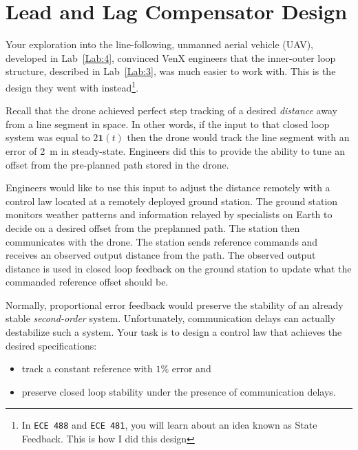 \chapter{Lead and Lag Compensator Design}\label{Lab:5}
Your exploration into the line-following, unmanned aerial vehicle (UAV), developed in Lab~\ref{Lab:4}, convinced VenX engineers that the inner-outer loop structure, described in Lab~\ref{Lab:3}, was much easier to work with.
This is the design they went with instead\footnote{In \texttt{ECE 488} and \texttt{ECE 481}, you will learn about an idea known as State Feedback. This is how I did this design}.
%
\begin{center}
  
\end{center}
%
Recall that the drone achieved perfect step tracking of a desired \emph{distance} away from a line segment in space.
In other words, if the input to that closed loop system was equal to \(2\mathbf{1}(t)\) then the drone would track the line segment with an error of \SI{2}{\meter} in steady-state.
Engineers did this to provide the ability to tune an offset from the pre-planned path stored in the drone.

Engineers would like to use this input to adjust the distance remotely with a control law located at a remotely deployed ground station.
The ground station monitors weather patterns and information relayed by specialists on Earth to decide on a desired offset from the preplanned path.
The station then communicates with the drone.
The station sends reference commands and receives an observed output distance from the path.
The observed output distance is used in closed loop feedback on the ground station to update what the commanded reference offset should be.

Normally, proportional error feedback would preserve the stability of an already stable \emph{second-order} system.
Unfortunately, communication delays can actually destabilize such a system.
Your task is to design a control law that achieves the desired specifications:
\begin{itemize}
  \item{track a constant reference with \(1\%\) error and}
  \item{preserve closed loop stability under the presence of communication delays.}
\end{itemize}

